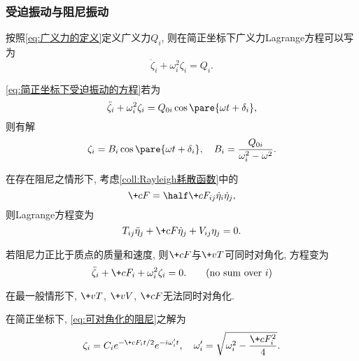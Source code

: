 \documentclass[../TheoreticalMechanics.tex]{subfiles}
\begin{document}

\subsubsection{受迫振动与阻尼振动} %
\label{ssub:受迫振动与阻尼振动}

\begin{lemma}[简正坐标下受迫振动的方程]
    按照\eqref{eq:广义力的定义}定义广义力$Q_i$, 则在简正坐标下广义力Lagrange方程可以写为
    \begin{equation}
        \label{eq:简正坐标下受迫振动的方程}
        \ddot{\zeta}_i + \omega_i^2\zeta_i = Q_i. 
    \end{equation}
\end{lemma}
\begin{finale}
    \begin{theorem}[简正坐标下受迫振动的解]
        \eqref{eq:简正坐标下受迫振动的方程}若为
        \[ \ddot{\zeta}_i + \omega_i^2\zeta_i = Q_{0i}\cos\pare{\omega t + \delta_i}, \]
        则有解
        \[ \zeta_i = B_i\cos\pare{\omega t + \delta_i},\quad B_i = \frac{Q_{0i}}{\omega_i^2 - \omega^2}. \]
    \end{theorem}
\end{finale}
\begin{lemma}[阻尼振动方程]
    在存在阻尼之情形下, 考虑\cref{coll:Rayleigh耗散函数}中的
    \[ \+cF = \half \+cF_{ij}\dot{\eta}_i\dot{\eta}_j, \]
    则Lagrange方程变为
    \begin{equation}
        \label{eq:阻尼振动方程}
        T_{ij}\ddot{\eta}_j + \+cF\dot{\eta}_j + V_{ij}\eta_j = 0. 
    \end{equation}
\end{lemma}
\begin{lemma}[可对角化的阻尼]
    若阻尼力正比于质点的质量和速度, 则$\+cF$与$\+vT$可同时对角化, 方程变为
    \begin{equation}
        \label{eq:可对角化的阻尼}
        \ddot{\zeta}_i + \+cF_i + \omega_i^2\zeta_i = 0.\qquad \mathrm{(no\ sum\ over\ }i \mathrm{)} 
    \end{equation}
\end{lemma}
\begin{remark}
    在最一般情形下, $\+vT$, $\+vV$, $\+cF$无法同时对角化.
\end{remark}
\begin{finale}
    \begin{theorem}[简正坐标下的阻尼振动解]
        在简正坐标下, \eqref{eq:可对角化的阻尼}之解为
        \[ \zeta_i = C_ie^{-\+cF_it/2}e^{-i\omega'_i t},\quad \omega'_i = \sqrt{\omega_i^2 - \frac{\+cF_i^2}{4}}. \]
    \end{theorem}
\end{finale}
\end{document}
